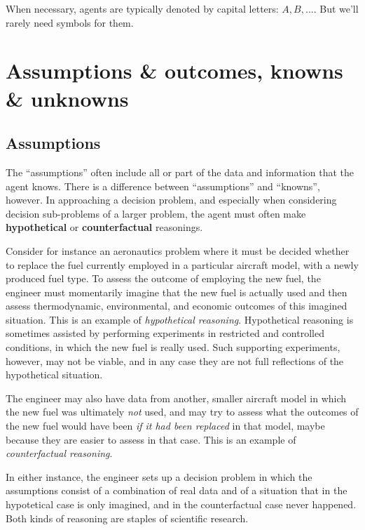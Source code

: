 \documentclass[
  a4paper,
  DIV=11,
  numbers=noendperiod,
  oneside]{scrreprt}
\begin{document}
When necessary, agents are typically denoted by capital letters:
\(A, B,\dotsc\). But we'll rarely need symbols for them.

\hypertarget{assumptions-outcomes-knowns-unknowns}{%
\section{Assumptions \& outcomes, knowns \&
unknowns}\label{assumptions-outcomes-knowns-unknowns}}

\hypertarget{assumptions}{%
\subsection{Assumptions}\label{assumptions}}

The ``assumptions'' often include all or part of the data and
information that the agent knows. There is a difference between
``assumptions'' and ``knowns'', however. In approaching a decision
problem, and especially when considering decision sub-problems of a
larger problem, the agent must often make \textbf{hypothetical} or
\textbf{counterfactual} reasonings.

Consider for instance an aeronautics problem where it must be decided
whether to replace the fuel currently employed in a particular aircraft
model, with a newly produced fuel type. To assess the outcome of
employing the new fuel, the engineer must momentarily imagine that the
new fuel is actually used and then assess thermodynamic, environmental,
and economic outcomes of this imagined situation. This is an example of
\emph{hypothetical reasoning}. Hypothetical reasoning is sometimes
assisted by performing experiments in restricted and controlled
conditions, in which the new fuel is really used. Such supporting
experiments, however, may not be viable, and in any case they are not
full reflections of the hypothetical situation.

The engineer may also have data from another, smaller aircraft model in
which the new fuel was ultimately \emph{not} used, and may try to assess
what the outcomes of the new fuel would have been \emph{if it had been
replaced} in that model, maybe because they are easier to assess in that
case. This is an example of \emph{counterfactual reasoning}.

In either instance, the engineer sets up a decision problem in which the
assumptions consist of a combination of real data and of a situation
that in the hypotetical case is only imagined, and in the counterfactual
case never happened. Both kinds of reasoning are staples of scientific
research.
\end{document}

